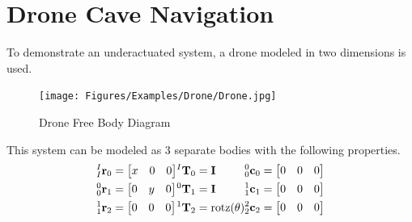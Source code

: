 \section{Drone Cave Navigation}  \label{sec:drone}

\noindent To demonstrate an underactuated system, a drone modeled in two dimensions is used.

\begin{figure}[H]
    \centering
    \texttt{[image: Figures/Examples/Drone/Drone.jpg]}
    \caption{Drone Free Body Diagram}
    \label{fig:drone}
\end{figure}
\noindent This system can be modeled as 3 separate bodies with the following properties.
\begin{align*}
    \begin{split}
        {^I_I \mathbf{r}_0} &= \begin{bmatrix} x & 0 & 0\end{bmatrix} \\
        {^0_0 \mathbf{r} _1} &= \begin{bmatrix} 0 & y & 0 \end{bmatrix} \\ 
        {^1_1 \mathbf{r} _2} &= \begin{bmatrix} 0& 0& 0 \end{bmatrix}\\
    \end{split}
    \begin{split}
        {^I \mathbf{T}_0} &= {\mathbf{I}}\\
        {^0 \mathbf{T}_1} &= {\mathbf{I}}\\
        {^1 \mathbf{T}_2} &= \text{rotz}(\theta)\\
    \end{split}
    \begin{split}
    \end{split}
    \begin{split}
        {^0_0 \mathbf{c}_0} &= \begin{bmatrix} 0& 0& 0 \end{bmatrix}\\
        {^1_1 \mathbf{c} _1} &= \begin{bmatrix} 0& 0& 0 \end{bmatrix}\\
        {^2_2 \mathbf{c} _2} &= \begin{bmatrix} 0& 0& 0 \end{bmatrix}\\
    \end{split}
\end{align*}
